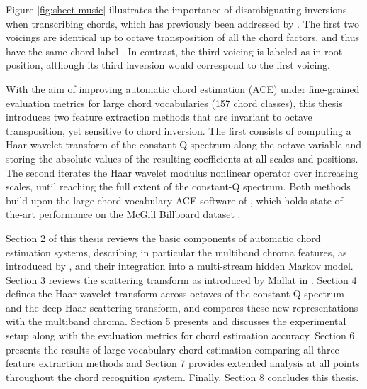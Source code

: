 Figure \ref{fig:sheet-music} illustrates the importance of disambiguating inversions
when transcribing chords, which has previously been addressed by
\cite{mauch2010approximate}.
The first two voicings are identical up
to octave transposition of all the chord factors, and thus have the
same chord label \Amin.
In contrast, the third voicing is labeled as \Csix 
 in root position, although its third inversion would correspond
to the first voicing.

With the aim of improving automatic chord estimation (ACE) under fine-grained
evaluation metrics for large chord vocabularies (157 chord classes), this thesis introduces two feature extraction methods
that are invariant to octave transposition, yet sensitive to
chord inversion.
The first consists of computing a Haar wavelet transform of
the constant-Q spectrum along the octave variable and storing
the absolute values of the resulting coefficients at all scales
and positions.
The second iterates the Haar wavelet modulus nonlinear operator
over increasing scales, until reaching the full extent of the
constant-Q spectrum.
Both methods build upon the large chord vocabulary ACE software of
\cite{cho2013mirex}, which holds state-of-the-art performance on
the McGill Billboard dataset \cite{burgoyne2011}.

Section 2 of this thesis reviews the basic components of automatic chord estimation systems, describing in particular the multiband chroma features, as
introduced by \cite{cho2013mirex}, and their integration into a multi-stream
hidden Markov model.
Section 3 reviews the scattering transform as introduced by Mallat in \cite{mallat2012group}.
Section 4 defines the Haar wavelet transform across octaves
of the constant-Q spectrum and the deep Haar scattering transform, and compares these new representations with the multiband chroma.
Section 5 presents and discusses the experimental setup along with the
evaluation metrics for chord estimation accuracy.
Section 6 presents the results of large vocabulary chord estimation comparing all three feature extraction methods and Section 7 provides extended analysis at all points throughout the chord recognition system. Finally, Section 8 concludes this thesis.
